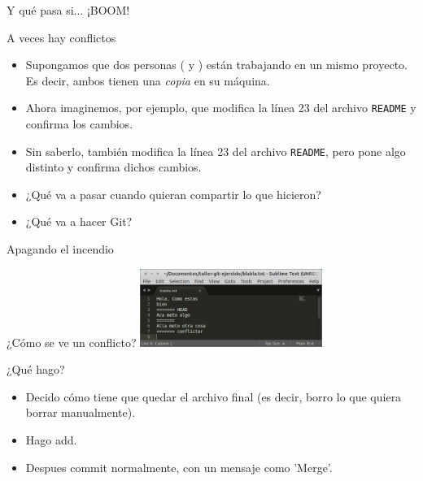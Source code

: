 \documentclass{beamer}
\begin{document}
\begin{frame}[t]{Y qué pasa si... ¡BOOM!}

    \begin{block}{A veces hay conflictos}
        \begin{itemize}
            \item Supongamos que dos personas ( y ) están trabajando en un mismo proyecto.
                Es decir, ambos tienen una \textit{copia} en su máquina.
            \pause
            \item Ahora imaginemos, por ejemplo, que  modifica la línea 23 del archivo \texttt{README}
                y confirma los cambios.
            \pause
            \item Sin saberlo,  también modifica la línea 23 del archivo \texttt{README}, pero pone algo distinto y confirma dichos cambios.
            \pause
            \item ¿Qué va a pasar cuando quieran compartir lo que hicieron?\\ 
            \pause
            \item ¿Qué va a hacer Git?\\ 
        \end{itemize}
    \end{block}

\end{frame}

\begin{frame}[t]{Apagando el incendio}

    \begin{block}{¿Cómo se ve un conflicto?}
        \includegraphics[height=1.0in]{images/conflicto.png}
    \end{block}

    \begin{block}{¿Qué hago?}
        \begin{itemize}
        \item Decido cómo tiene que quedar el archivo final (es decir, borro lo que quiera borrar manualmente).
        \pause
        \item Hago add.
		\pause
        \item
        Despues commit normalmente, con un mensaje como 'Merge'.
        \end{itemize}
    \end{block}

\end{frame}
\end{document}
